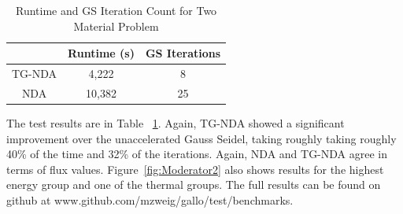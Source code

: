 \begin{table}[!htb]
\centering
\caption{Runtime and GS Iteration Count for Two Material Problem}
    \label{tab:two}
\begin{center}
    \begin{tabular}{|c|c|c|}
    \hline
    & Runtime (s) & GS Iterations \\
    \hline
    TG-NDA & 4,222 & 8 \\
    NDA & 10,382 & 25 \\
    \hline
    \end{tabular}
\end{center}
\end{table}

The test results are in Table ~\ref{tab:two}. Again, TG-NDA showed a significant improvement over the unaccelerated Gauss Seidel, taking roughly taking roughly 40\% of the time and 32\% of the iterations. Again, NDA and TG-NDA agree in terms of flux values. Figure~\ref{fig:Moderator2} also shows results for the highest energy group and one of the thermal groups. The full results can be found on github at www.github.com/mzweig/gallo/test/benchmarks.


